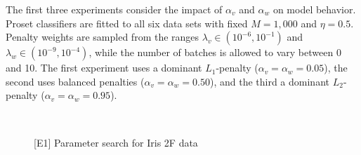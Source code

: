 %
The first three experiments consider the impact of $\alpha_v$ and $\alpha_w$ on model behavior.
Proset classifiers are fitted to all six data sets with fixed $M=1,000$ and $\eta=0.5$.
Penalty weights are sampled from the ranges $\lambda_v\in(10^{-6},10^{-1})$ and $\lambda_w\in(10^{-9},10^{-4})$, while the number of batches is allowed to vary between 0 and 10.
The first experiment uses a dominant $L_1$-penalty ($\alpha_v=\alpha_w=0.05$), the second uses balanced penalties ($\alpha_v=\alpha_w=0.50$), and the third a dominant $L_2$-penalty ($\alpha_v=\alpha_w=0.95$).\par
%
\begin{figure}
\caption{[E1] Parameter search for Iris 2F data}
\label{fig_parameter_search}
%
\begin{center}
\\
\end{center}
\end{figure}
